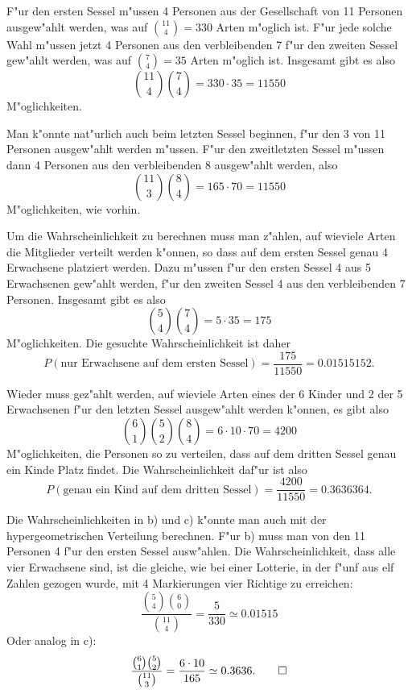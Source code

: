 \begin{loesung}
\begin{teilaufgaben}
\item F"ur den ersten Sessel m"ussen 4 Personen aus der Gesellschaft
von 11 Personen ausgew"ahlt werden, was auf $\binom{11}{4}=330$
Arten m"oglich ist. F"ur jede solche Wahl m"ussen jetzt 4 Personen
aus den verbleibenden 7 f"ur den zweiten Sessel gew"ahlt werden,
was auf $\binom{7}{4}=35$ Arten m"oglich ist. Insgesamt gibt es
also 
\[
\binom{11}{4}\binom{7}{4}=330\cdot 35=11550
\]
M"oglichkeiten.

Man k"onnte nat"urlich auch beim letzten Sessel beginnen, f"ur
den 3 von 11 Personen ausgew"ahlt werden m"ussen. F"ur den 
zweitletzten Sessel m"ussen dann 4 Personen aus den verbleibenden
8 ausgew"ahlt werden, also 
\[
\binom{11}{3}\binom{8}{4}=165\cdot 70=11550
\]
M"oglichkeiten, wie vorhin.
\item
Um die Wahrscheinlichkeit zu berechnen muss man z"ahlen, auf
wieviele Arten die Mitglieder verteilt werden k"onnen, so dass
auf dem ersten Sessel genau 4 Erwachsene platziert werden.
Dazu m"ussen f"ur den ersten Sessel 4 aus 5 Erwachsenen gew"ahlt werden,
f"ur den zweiten Sessel 4 aus den verbleibenden 7 Personen. Insgesamt
gibt es also
\[
\binom{5}{4}\binom{7}{4}=5\cdot 35=175
\]
M"oglichkeiten. Die gesuchte Wahrscheinlichkeit ist daher
\[
P(\text{nur Erwachsene auf dem ersten Sessel})=
\frac{175}{11550}=0.01515152.
\]
\item
Wieder muss gez"ahlt werden, auf wieviele Arten eines der 6 Kinder
und 2 der 5 Erwachsenen 
f"ur
den letzten Sessel ausgew"ahlt werden k"onnen, es gibt also
\[
\binom{6}{1}\binom{5}{2}\binom{8}{4}=6\cdot 10\cdot70=4200
\]
M"oglichkeiten, die Personen so zu verteilen, dass auf dem dritten
Sessel genau ein Kinde Platz findet. Die Wahrscheinlichkeit daf"ur ist
also
\[
P(\text{genau ein Kind auf dem dritten Sessel})=\frac{4200}{11550}=0.3636364.
\]
\end{teilaufgaben}
Die Wahrscheinlichkeiten in b) und c) k"onnte man auch mit der
hypergeometrischen Verteilung berechnen. F"ur b) muss man von
den 11 Personen 4 f"ur den ersten Sessel ausw"ahlen.
Die Wahrscheinlichkeit,
dass alle vier Erwachsene sind, ist
die gleiche, wie bei einer Lotterie, in der f"unf aus elf Zahlen gezogen wurde,
mit 4 Markierungen vier Richtige zu erreichen:
\[
\frac{
\binom{5}{4}\binom{6}{0}
}{
\binom{11}{4}
}
=\frac{5}{330}\simeq 0.01515
\]
Oder analog in c):
\[
\frac{
\binom{6}{1}\binom{5}{2}
}{
\binom{11}{3}
}
=\frac{6\cdot 10}{165}\simeq 0.3636.
\qedhere
\]
\end{loesung}
